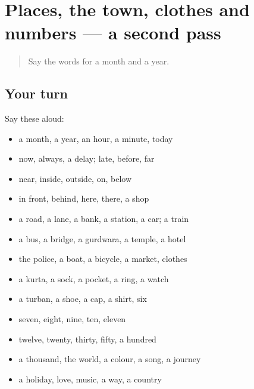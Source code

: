 \section[(dialogue)]{Places, the town, clothes and numbers — a second pass}

\label{lesson:PA-R98-second-pass-places-the-town-clothes-and-numbers}



\begin{quote}
Say the words for a month and a year.
\end{quote}

\subsection*{Your turn}
Say these aloud:

\begin{itemize}
\raggedright
  \item a month, a year, an hour, a minute, today
  \item now, always, a delay; late, before, far
  \item near, inside, outside, on, below
  \item in front, behind, here, there, a shop
  \item a road, a lane, a bank, a station, a car; a train
  \item a bus, a bridge, a gurdwara, a temple, a hotel
  \item the police, a boat, a bicycle, a market, clothes
  \item a kurta, a sock, a pocket, a ring, a watch
  \item a turban, a shoe, a cap, a shirt, six
  \item seven, eight, nine, ten, eleven
  \item twelve, twenty, thirty, fifty, a hundred
  \item a thousand, the world, a colour, a song, a journey
  \item a holiday, love, music, a way, a country
\end{itemize}

